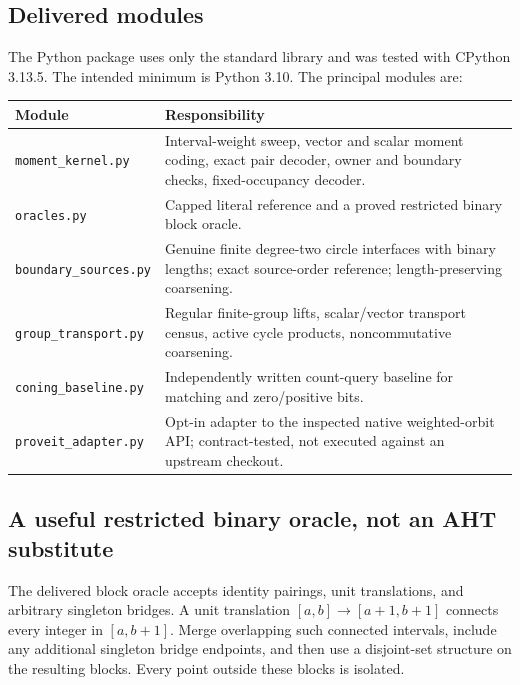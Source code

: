 \documentclass[11pt]{article}
\theoremstyle{definition}\newtheorem{definition}[theorem]{Definition}\newtheorem{example}[theorem]{Example}
\theoremstyle{remark}\newtheorem{remark}[theorem]{Remark}
\newcommand{\code}[1]{\texttt{#1}}
\begin{document}
\subsection{Delivered modules}
The Python package uses only the standard library and was tested with CPython 3.13.5. The intended minimum is Python 3.10. The principal modules are:
\begin{center}\small
\begin{tabularx}{\textwidth}{@{}lX@{}}\toprule
Module & Responsibility\\\midrule
\code{moment\_kernel.py} & Interval-weight sweep, vector and scalar moment coding, exact pair decoder, owner and boundary checks, fixed-occupancy decoder.\\
\code{oracles.py} & Capped literal reference and a proved restricted binary block oracle.\\
\code{boundary\_sources.py} & Genuine finite degree-two circle interfaces with binary lengths; exact source-order reference; length-preserving coarsening.\\
\code{group\_transport.py} & Regular finite-group lifts, scalar/vector transport census, active cycle products, noncommutative coarsening.\\
\code{coning\_baseline.py} & Independently written count-query baseline for matching and zero/positive bits.\\
\code{proveit\_adapter.py} & Opt-in adapter to the inspected native weighted-orbit API; contract-tested, not executed against an upstream checkout.\\\bottomrule
\end{tabularx}
\end{center}

\subsection{A useful restricted binary oracle, not an AHT substitute}
The delivered block oracle accepts identity pairings, unit translations, and arbitrary singleton bridges. A unit translation $[a,b]\to[a+1,b+1]$ connects every integer in $[a,b+1]$. Merge overlapping such connected intervals, include any additional singleton bridge endpoints, and then use a disjoint-set structure on the resulting blocks. Every point outside these blocks is isolated.
\end{document}
